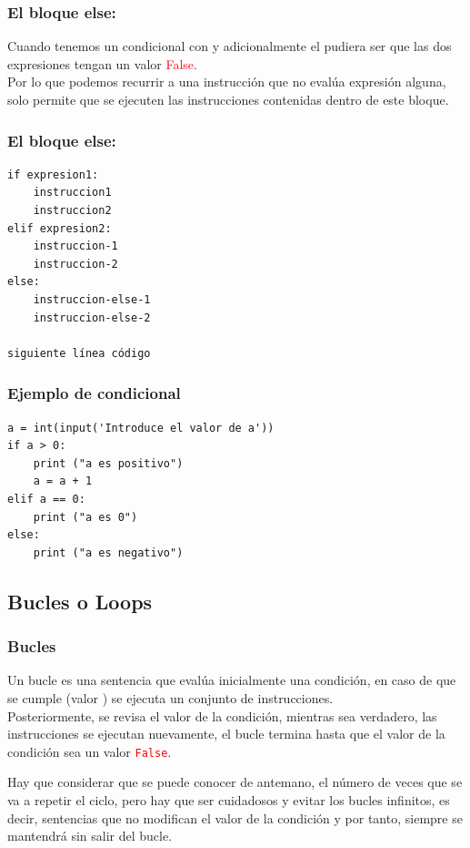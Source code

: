 \begin{frame}
\frametitle{El bloque else:}
Cuando tenemos un condicional con  y adicionalmente el  pudiera ser que las dos expresiones tengan un valor \textcolor{red}{False}.
\\
\bigskip
Por lo que podemos recurrir a una instrucción  que no evalúa expresión alguna, solo permite que se ejecuten las instrucciones contenidas dentro de este bloque.
\end{frame}
\begin{frame}[fragile]
\frametitle{El bloque else:}
\begin{verbatim}
if expresion1:
    instruccion1
    instruccion2
elif expresion2:
    instruccion-1
    instruccion-2
else:
    instruccion-else-1
    instruccion-else-2

siguiente línea código
\end{verbatim}
\end{frame}
\begin{frame}[fragile]
\frametitle{Ejemplo de condicional}
\begin{lstlisting}[basicstyle=\linespread{1.2}\ttfamily\small, columns=fullflexible]
a = int(input('Introduce el valor de a'))
if a > 0:
    print ("a es positivo")
    a = a + 1
elif a == 0: 
    print ("a es 0")
else:
    print ("a es negativo")
\end{lstlisting}
\end{frame}
\subsection{Bucles o Loops}
\begin{frame}
\frametitle{Bucles}
Un bucle es una sentencia que evalúa inicialmente una condición, en caso de que se cumple (valor ) se ejecuta un conjunto de instrucciones.
\\
\bigskip
Posteriormente, se revisa el valor de la condición, mientras sea verdadero, las instrucciones se ejecutan nuevamente, el bucle termina hasta que el valor de la condición sea un valor \textcolor{red}{\texttt{False}}.
\end{frame}
\begin{frame}
Hay que considerar que se puede conocer de antemano, el número de veces que se va a repetir el ciclo, pero hay que ser cuidadosos y evitar los bucles infinitos, es decir, sentencias que no modifican el valor de la condición y por tanto, siempre se mantendrá sin salir del bucle.
\end{frame}
